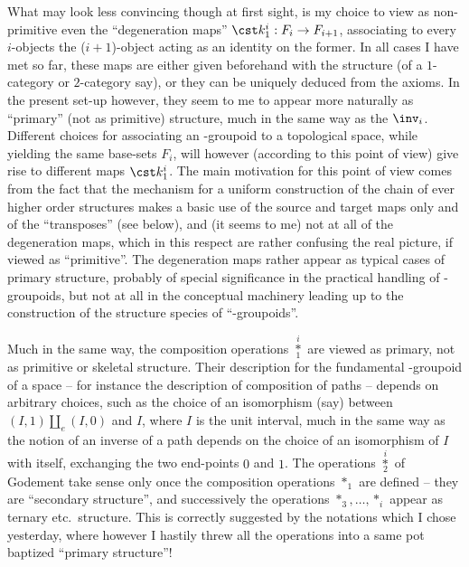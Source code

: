 What may look less convincing though at first sight, is my choice to
view as non-primitive even the ``degeneration maps'' $\cst k_1^i : F_i
\to F_{i+1}$, associating to every $i$-objects the ($i+1$)-object acting
as an identity on the former. In all cases I have met so far, these
maps are either given beforehand with the structure (of a $1$-category
or $2$-category say), or they can be uniquely deduced from the
axioms. In the present set-up however, they seem to me to appear more
naturally as ``primary'' (not as primitive) structure, much in the
same way as the $\inv_i$. Different choices for associating an
\oo-groupoid to a topological space, while yielding the same base-sets
$F_i$, will however (according to this point of view) give rise to
different maps $\cst k_1^i$. The main motivation for this point of
view comes from the fact that the mechanism for a uniform construction
of the chain of ever higher order structures makes a basic use of the
source and target maps only and of the ``transposes'' (see below), and
(it seems to me) not at all of the degeneration maps, which in this
respect are rather confusing the real picture, if viewed as
``primitive''.
The degeneration maps rather appear as typical cases of primary
structure, probably of special significance in the practical handling
of \oo-groupoids, but not at all in the conceptual machinery leading
up to the construction of the structure species of ``\oo-groupoids''.

Much in the same way, the composition operations
$\overset{i}{\underset{1}{*}}$ are viewed as primary, not as
primitive or skeletal structure. Their description for the fundamental
\oo-groupoid of a space -- for instance the description of composition
of paths -- depends on arbitrary choices, such as the choice of an
isomorphism (say) between $(I,1) \amalg_e (I,0)$ and $I$, where $I$ is
the unit interval, much in the same way as the notion of an inverse of
a path depends on the choice of an isomorphism of $I$ with itself,
exchanging the two end-points $0$ and $1$. The operations
$\overset{i}{\underset{2}{*}}$ of Godement take sense only once the
composition operations $*_1$ are defined -- they are ``secondary
structure'', and successively the operations $*_3, \ldots, *_i$ appear
as ternary etc.\ structure. This is correctly suggested by the
notations which I chose yesterday, where however I hastily threw all
the operations into a same pot baptized ``primary structure''!

